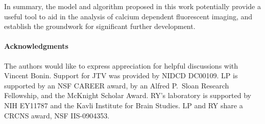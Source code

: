 


In summary, the model and algorithm proposed in this work potentially provide a useful tool to aid in the analysis of calcium dependent fluorescent imaging, and establish the groundwork for significant further development.



\paragraph{Acknowledgments}

The authors would like to express appreciation for helpful discussions with Vincent Bonin.  Support for JTV was provided by NIDCD DC00109. LP is supported by an NSF CAREER award, by an Alfred P.\ Sloan Research Fellowship, and the McKnight Scholar Award. RY's laboratory is supported by NIH EY11787 and the Kavli Institute for Brain Studies. LP and RY share a CRCNS award, NSF IIS-0904353.



